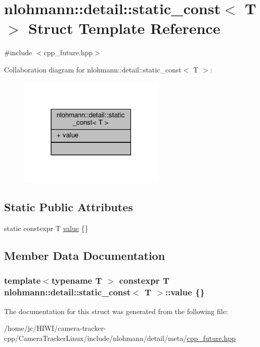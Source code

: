 \hypertarget{structnlohmann_1_1detail_1_1static__const}{}\section{nlohmann\+:\+:detail\+:\+:static\+\_\+const$<$ T $>$ Struct Template Reference}
\label{structnlohmann_1_1detail_1_1static__const}


{\ttfamily \#include $<$cpp\+\_\+future.\+hpp$>$}



Collaboration diagram for nlohmann\+:\+:detail\+:\+:static\+\_\+const$<$ T $>$\+:\nopagebreak
\begin{figure}[H]
\begin{center}
\leavevmode
\includegraphics[width=198pt]{structnlohmann_1_1detail_1_1static__const__coll__graph}
\end{center}
\end{figure}
\subsection*{Static Public Attributes}
\begin{DoxyCompactItemize}
\item 
static constexpr T \hyperlink{structnlohmann_1_1detail_1_1static__const_a6bb7ab2ddd6abc41fb4ffb7c6dfa237e}{value} \{\}
\end{DoxyCompactItemize}


\subsection{Member Data Documentation}
\subsubsection[{\texorpdfstring{value}{value}}]{\setlength{\rightskip}{0pt plus 5cm}template$<$typename T $>$ constexpr T {\bf nlohmann\+::detail\+::static\+\_\+const}$<$ T $>$\+::value \{\}\hspace{0.3cm}{\ttfamily [static]}}\hypertarget{structnlohmann_1_1detail_1_1static__const_a6bb7ab2ddd6abc41fb4ffb7c6dfa237e}{}\label{structnlohmann_1_1detail_1_1static__const_a6bb7ab2ddd6abc41fb4ffb7c6dfa237e}


The documentation for this struct was generated from the following file\+:\begin{DoxyCompactItemize}
\item 
/home/jc/\+H\+I\+W\+I/camera-\/tracker-\/cpp/\+Camera\+Tracker\+Linux/include/nlohmann/detail/meta/\hyperlink{cpp__future_8hpp}{cpp\+\_\+future.\+hpp}\end{DoxyCompactItemize}
